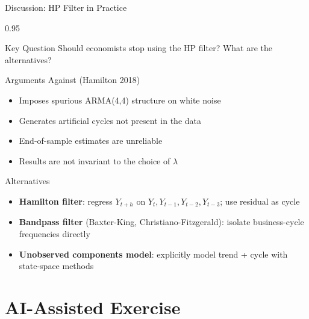 \documentclass[9pt, aspectratio=169, t]{beamer}
\begin{document}
\begin{frame}{Discussion: HP Filter in Practice}
    \begin{cminipage}{0.95\textwidth}
    {\small
    \begin{alertblock}{Key Question}
        Should economists stop using the HP filter? What are the alternatives?
    \end{alertblock}
    \begin{block}{Arguments Against (Hamilton 2018)}
        \begin{itemize}\setlength{\itemsep}{0pt}
            \item Imposes spurious ARMA(4,4) structure on white noise
            \item Generates artificial cycles not present in the data
            \item End-of-sample estimates are unreliable
            \item Results are not invariant to the choice of $\lambda$
        \end{itemize}
    \end{block}
    \begin{exampleblock}{Alternatives}
        \begin{itemize}\setlength{\itemsep}{0pt}
            \item \textbf{Hamilton filter}: regress $Y_{t+h}$ on $Y_t, Y_{t-1}, Y_{t-2}, Y_{t-3}$; use residual as cycle
            \item \textbf{Bandpass filter} (Baxter-King, Christiano-Fitzgerald): isolate business-cycle frequencies directly
            \item \textbf{Unobserved components model}: explicitly model trend + cycle with state-space methods
        \end{itemize}
    \end{exampleblock}
    }
    \end{cminipage}
\end{frame}

\section{AI-Assisted Exercise}
\end{document}
